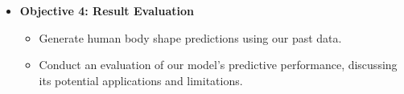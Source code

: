 \begin{itemize}
	\item \textbf{Objective 4: Result Evaluation}
	      \begin{itemize}
		      \item Generate human body shape predictions using our past data.
		      \item Conduct an evaluation of our model's predictive performance, discussing its
		            potential applications and limitations.
	      \end{itemize}

\end{itemize}
